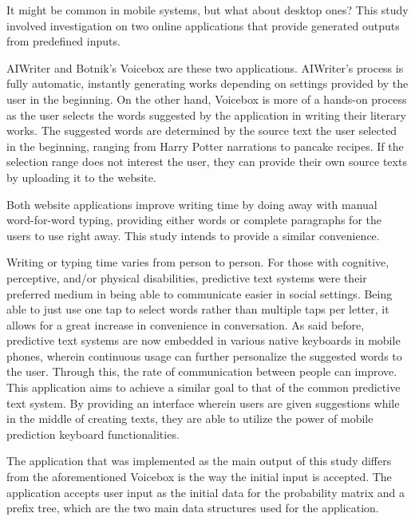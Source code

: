 \documentclass[journal]{./IEEE/IEEEtran}
\begin{document}
It might be common in mobile systems, but what about desktop ones? This study involved investigation on two online applications that provide generated outputs from predefined inputs.

AIWriter\cite{AIWriter} and Botnik's Voicebox are these two applications. AIWriter's process is fully automatic, instantly generating works depending on settings provided by the user in the beginning. On the other hand, Voicebox is more of a hands-on process as the user selects the words suggested by the application in writing their literary works. The suggested words are determined by the source text the user selected in the beginning, ranging from Harry Potter narrations to pancake recipes. If the selection range does not interest the user, they can provide their own source texts by uploading it to the website.

Both website applications improve writing time by doing away with manual word-for-word typing, providing either words or complete paragraphs for the users to use right away. This study intends to provide a similar convenience.

Writing or typing time varies from person to person. For those with cognitive, perceptive, and/or physical disabilities, predictive text systems were their preferred medium in being able to communicate easier in social settings. \cite{GV2006} Being able to just use one tap to select words rather than multiple taps per letter, it allows for a great increase in convenience in conversation. As said before, predictive text systems are now embedded in various native keyboards in mobile phones, wherein continuous usage can further personalize the suggested words to the user. Through this, the rate of communication between people can improve. This application aims to achieve a similar goal to that of the common predictive text system. By providing an interface wherein users are given suggestions while in the middle of creating texts, they are able to utilize the power of mobile prediction keyboard functionalities.


The application that was implemented as the main output of this study differs from the aforementioned Voicebox is the way the initial input is accepted. The application accepts user input as the initial data for the probability matrix and a prefix tree, which are the two main data structures used for the application.
\end{document}
